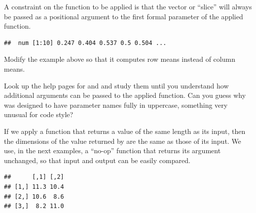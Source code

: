 \documentclass[krantz2]{krantz}\usepackage{knitr}
\begin{document}
\begin{warningbox}
A constraint on the function to be applied is that the vector or ``slice'' will always be passed as a positional argument to the first formal parameter of the applied function.
\end{warningbox}

\begin{knitrout}\footnotesize
{}\color{fgcolor}\begin{kframe}
\begin{alltt}
 \hlkwb{<-} \hlstd{(}\hlstd{(}\hlstd{),}  \hlstd{=} \hlstd{)}
 \hlkwb{<-}   \hlstd{=} \hlstd{,}  
\end{alltt}
\begin{verbatim}
##  num [1:10] 0.247 0.404 0.537 0.5 0.504 ...
\end{verbatim}
\end{kframe}
\end{knitrout}

\begin{playground}
Modify the example above so that it computes row means instead of column means.
\end{playground}

\begin{playground}
Look up the help pages for  and  and study them until you understand how additional arguments can be passed to the applied function. Can you guess why  was designed to have parameter names fully in uppercase, something very unusual for \Rlang code style?
\end{playground}

If we apply a function that returns a value of the same length as its input, then the dimensions of the value returned by  are the same as those of its input. We use, in the next examples, a ``no-op'' function that returns its argument unchanged, so that input and output can be easily compared.

\begin{knitrout}\footnotesize
{}\color{fgcolor}\begin{kframe}
\begin{alltt}
 \hlkwb{<-} \hlstd{(}\hlstd{(}\hlstd{,}  \hlstd{=} \hlstd{,}  \hlstd{=} \hlstd{),}  \hlstd{=} \hlstd{)}
 \hlkwb{<-}   \hlstd{=} \hlstd{)}
\end{alltt}
\begin{verbatim}
##      [,1] [,2]
## [1,] 11.3 10.4
## [2,] 10.6  8.6
## [3,]  8.2 11.0
\end{verbatim}
\end{kframe}
\end{knitrout}
\end{document}
